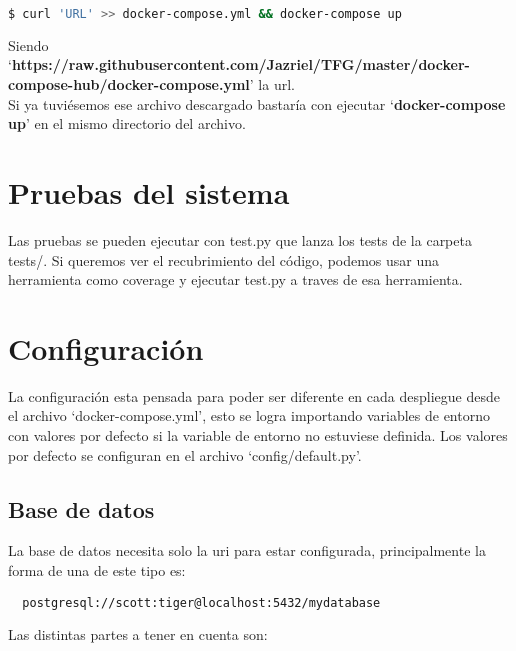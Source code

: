 \lstset{style=linestyle}
\begin{lstlisting}[language=bash]
$ curl 'URL' >> docker-compose.yml && docker-compose up
\end{lstlisting}

Siendo `\textbf{https://raw.githubusercontent.com/Jazriel/TFG/master/docker-compose-hub/docker-compose.yml}' la url.
\hphantom{sin esto quedaba mal}\\

Si ya tuviésemos ese archivo descargado bastaría con ejecutar `\textbf{docker-compose up}' en el mismo directorio del archivo.

\section{Pruebas del sistema}

Las pruebas se pueden ejecutar con test.py que lanza los tests de la carpeta tests/. Si queremos ver el recubrimiento del código, podemos usar una herramienta como coverage y ejecutar test.py a traves de esa herramienta.  


\section{Configuración}

La configuración esta pensada para poder ser diferente en cada despliegue desde el archivo `docker-compose.yml', esto se logra importando variables de entorno con valores por defecto si la variable de entorno no estuviese definida. Los valores por defecto se configuran en el archivo `config/default.py'.


\subsection{Base de datos}
La base de datos necesita solo la uri para estar configurada, principalmente la forma de una de este tipo es:


\lstset{style=linestyle}
\begin{lstlisting}
  postgresql://scott:tiger@localhost:5432/mydatabase
\end{lstlisting}

Las distintas partes a tener en cuenta son:

